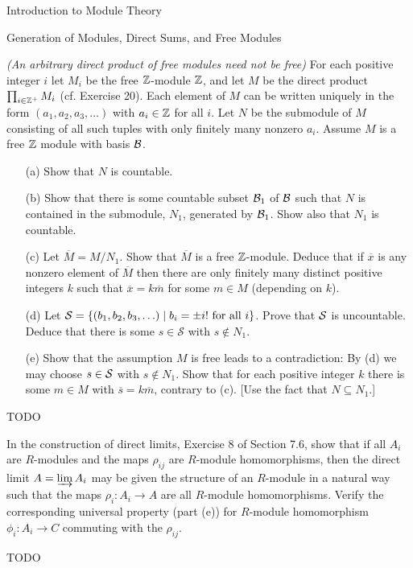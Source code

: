 \begin{chapter}{Introduction to Module Theory}
\begin{section}{Generation of Modules, Direct Sums, and Free Modules}
\begin{problem}\label{ex:10.3.24}
\emph{(An arbitrary direct product of free modules need not be free)} For each positive integer $i$ let $M_i$ be the free $\mathbb{Z}$-module $\mathbb{Z}$, and let $M$ be the direct product $\prod_{i\in\mathbb{Z}^+}M_i$ (cf. Exercise 20). Each element of $M$ can be written uniquely in the form $(a_1,a_2,a_3,\ldots)$ with $a_i\in \mathbb{Z}$ for all $i$. Let $N$ be the submodule of $M$ consisting of all such tuples with only finitely many nonzero $a_i$. Assume $M$ is a free $\mathbb{Z}$ module with basis $\mathcal{B}$. \begin{enumerate}
\item[(a)] Show that $N$ is countable.
\item[(b)] Show that there is some countable subset $\mathcal{B}_1$ of $\mathcal{B}$ such that $N$ is contained in the submodule, $N_1$, generated by $\mathcal{B}_1$. Show also that $N_1$ is countable.
\item[(c)] Let $\overline{M} = M/N_1$. Show that $\overline{M}$ is a free $\mathbb{Z}$-module. Deduce that if $\overline{x}$ is any nonzero element of $\overline{M}$ then there are only finitely many distinct positive integers $k$ such that $\overline{x} = k\overline{m}$ for some $m\in M$ (depending on $k$).
\item[(d)] Let $\mathcal{S} = \{(b_1,b_2,b_3,\ldots)\mid b_i=\pm i!\text{ for all } i\}$. Prove that $\mathcal{S}$ is uncountable. Deduce that there is some $s\in \mathcal{S}$ with $s\notin N_1$.
\item[(e)] Show that the assumption $M$ is free leads to a contradiction: By (d) we may choose $s\in\mathcal{S}$ with $s\notin N_1$. Show that for each positive integer $k$ there is some $m\in M$ with $\overline{s} = k\overline{m}$, contrary to (c). [Use the fact that $N\subseteq N_1$.]
\end{enumerate}
\end{problem}
\begin{solution}TODO

\end{solution}\oneperpage



\begin{problem}\label{ex:10.3.25}
In the construction of direct limits, Exercise 8 of Section 7.6, show that if all $A_i$ are $R$-modules and the maps $\rho_{ij}$ are $R$-module homomorphisms, then the direct limit $A=\varinjlim A_i$ may be given the structure of an $R$-module in a natural way such that the maps $\rho_i:A_i\to A$ are all $R$-module homomorphisms. Verify the corresponding universal property (part (e)) for $R$-module homomorphism $\phi_i:A_i\to C$ commuting with the $\rho_{ij}$. 
\end{problem}
\begin{solution}TODO


\end{solution}
\end{section}
\end{chapter}
